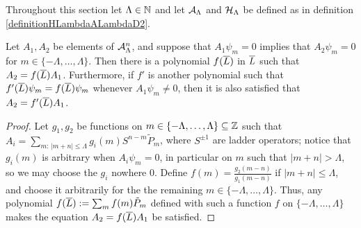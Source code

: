        
        



Throughout this section let $\Lambda \in \mathbb{N}$ and let $\mathcal A_\Lambda$ and $\mathcal H_\Lambda$ be defined as in definition \ref{definitionHLambdaALambdaD2}.

\begin{lemma}\label{lemmaExistsPolynomialInLTakingSameGradeToItD2}
Let $A_1, A_2$ be elements of $\mathcal A_\Lambda^n$, and suppose that $A_1 \psi_m = 0$ implies that $A_2\psi_m = 0$ for $m \in \{-\Lambda, \dots, \Lambda\}$.
Then there is a polynomial $f(\overline{L})$ in $\overline{L}$ such that $A_2 = f(\overline{L}) A_1$. Furthermore, if $f'$ is another polynomial such that $f'(\overline{L})\psi_m = f(\overline{L})\psi_m$ whenever $A_1 \psi_m \neq 0$, then it is also satisfied that $A_2 = f'(\overline{L}) A_1$.
\end{lemma}
\begin{proof}
Let $g_1, g_2$ be functions on $m \in \{-\Lambda, \dots, \Lambda\}\subseteq \mathbb{Z}$ such that $A_i = \sum_{m: \, |m+n| \leq \Lambda} g_i(m) S^{n-m} \tilde P_m$, where $S^{\pm 1}$ are ladder operators; notice that $g_i(m)$ is arbitrary when $A_i \psi_m = 0$, in particular on $m$ such that $|m+n| > \Lambda$, so we may choose the $g_i$ nowhere $0$. Define $f(m) = \frac{g_2(m-n)}{g_1(m-n)}$ if $|m+n| \leq \Lambda$, and choose it arbitrarily for the the remaining $m \in \{-\Lambda, \dots, \Lambda\}$. Thus, any polynomial $f(\overline{L}) := \sum_{m} f(m) \tilde P_m$ defined with such a function $f$ on $\{-\Lambda, \dots, \Lambda\}$ makes the equation $A_2 = f(\overline{L}) A_1$ be satisfied.
\end{proof}

